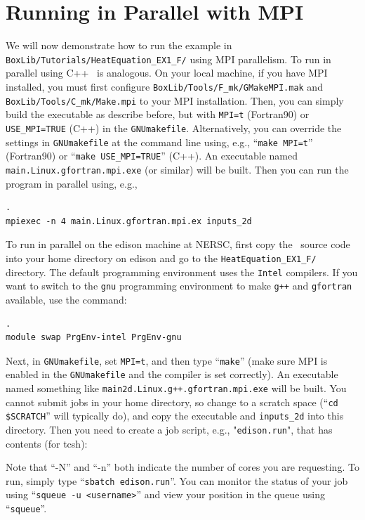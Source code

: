\section{Running in Parallel with MPI}
We will now demonstrate how to run the example in {\tt BoxLib/Tutorials/HeatEquation\_EX1\_F/}
using MPI parallelism.  To run in parallel using C++ \BoxLib\ is analogous.
On your local machine, if you have MPI installed, you must first configure
{\tt BoxLib/Tools/F\_mk/GMakeMPI.mak} and {\tt BoxLib/Tools/C\_mk/Make.mpi}
to your MPI installation.  Then, you 
can simply build the executable as describe before, but with {\tt MPI=t} (Fortran90)
or {\tt USE\_MPI=TRUE} (C++) in the {\tt GNUmakefile}.  Alternatively, you can override the settings in 
{\tt GNUmakefile} at the command line using, e.g., ``{\tt make MPI=t}'' (Fortran90)
or ``{\tt make USE\_MPI=TRUE}'' (C++).  
An executable named {\tt main.Linux.gfortran.mpi.exe} (or similar) will be built.
Then you can run the program in parallel using, e.g.,
\begin{lstlisting}[backgroundcolor=\color{light-red}].
mpiexec -n 4 main.Linux.gfortran.mpi.ex inputs_2d
\end{lstlisting}

To run in parallel on the edison machine at NERSC, first copy the \BoxLib\ source code
into your home directory on edison and go to the {\tt HeatEquation\_EX1\_F/} directory.
The default programming environment uses the {\tt Intel} compilers.  If you want
to switch to the
{\tt gnu} programming environment to make {\tt g++} and {\tt gfortran} available,
use the command:
\begin{lstlisting}[backgroundcolor=\color{light-red}].
module swap PrgEnv-intel PrgEnv-gnu
\end{lstlisting}
Next, in {\tt GNUmakefile}, set {\tt MPI=t}, and then type ``{\tt make}''
(make sure MPI is enabled in the {\tt GNUmakefile} and the compiler is set correctly).
An executable named something like 
{\tt main2d.Linux.g++.gfortran.mpi.exe} will be built.
You cannot submit jobs in your home directory, so change to a scratch space
(``{\tt cd \$SCRATCH}'' will typically do), and copy the executable and
{\tt inputs\_2d} into this directory.  Then you need to create a job script,
e.g., "{\tt edison.run}", that has contents (for tcsh):

Note that ``-N'' and ``-n'' both indicate the number of cores you are requesting.
To run, simply type ``{\tt sbatch edison.run}''.  You can monitor the status of your job
using ``{\tt squeue -u <username>}'' and view your position in the queue 
using ``{\tt squeue}''.

